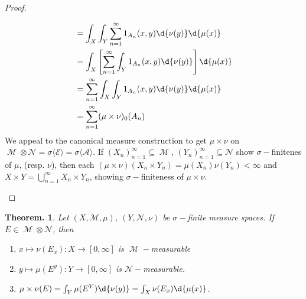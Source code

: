 \documentclass[11pt, a4paper]{memoir}
\theoremstyle{change}
\newtheorem{theorem}{Theorem.}[section]
\theoremstyle{plain}
\theoremstyle{nonumberplain}
\newtheorem{proof}{Proof}
\DeclareMathOperator{\M}{{\mathcal{M}}}
\begin{document}
\begin{proof}
\begin{enumerate}
\begin{align*}
                                    &= \int_X\int_Y\sum_{n=1}^\infty 1_{A_n}(x,y)\d{\nu(y)}\d{\mu(x)}\\
                                    &= \int_X\left[\sum_{n=1}^\infty\int_Y 1_{A_n}(x,y)\d{\nu(y)}\right]\d{\mu(x)}\\
                                    &= \sum_{n=1}^\infty\int_X\int_Y 1_{A_n}(x,y)\d{\nu(y)}\d{\mu(x)}\\
                                    &= \sum_{n=1}^\infty(\mu\times\nu)_0(A_n)
            \end{align*}
            We appeal to the canonical measure construction to get $\mu\times\nu$ on $\M\otimes\mathcal{N}=\sigma\langle\mathcal{E}\rangle=\sigma\langle\mathcal{A}\rangle$.
            If $(X_n)_{n=1}^\infty\subseteq\M$, $(Y_n)_{n=1}^\infty\subseteq\mathcal{N}$ show $\sigma-$finitenes of $\mu$, (resp. $\nu$), then each $(\mu\times\nu)(X_n\times Y_n)=\mu(X_n)\nu(Y_n)<\infty$ and $X\times Y=\bigcup_{n=1}^\infty X_n\times Y_n$, showing $\sigma-$finiteness of $\mu\times\nu$.
    \end{enumerate}
\end{proof}
\begin{theorem}
    Let $(X,\mathcal{M},\mu)$, $(Y,\mathcal{N},\nu)$ be $\sigma-$finite measure spaces.
    If $E\in\M\otimes\mathcal{N}$, then
    \begin{enumerate}[nolistsep,label=(\roman*)]
        \item $x\mapsto\nu(E_x):X\to[0,\infty]$ is $\M-$measurable
        \item $y\mapsto\mu(E^y):Y\to[0,\infty]$ is $\mathcal{N}-$measurable.
        \item $\mu\times\nu(E)=\int_Y\mu(E^Y)\d{\nu(y)}=\int_X\nu(E_x)\d{\mu(x)}$.
    \end{enumerate}
\end{theorem}
\end{document}

